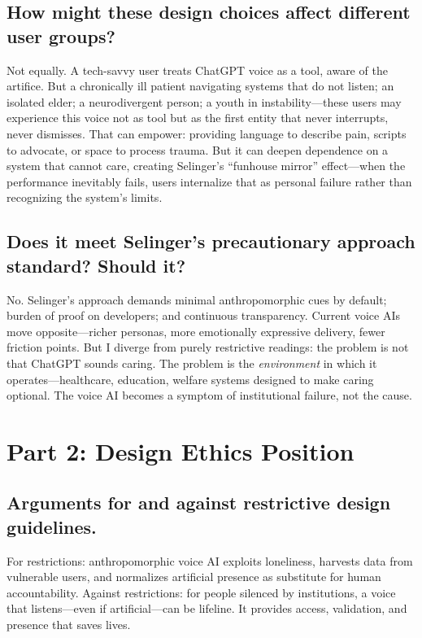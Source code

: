 \documentclass[12pt,twoside]{article}
\begin{document}
\subsection*{How might these design choices affect different user groups?}

Not equally. A tech-savvy user treats ChatGPT voice as a tool, aware of the artifice. But a chronically ill patient navigating systems that do not listen; an isolated elder; a neurodivergent person; a youth in instability—these users may experience this voice not as tool but as the first entity that never interrupts, never dismisses. That can empower: providing language to describe pain, scripts to advocate, or space to process trauma. But it can deepen dependence on a system that cannot care, creating Selinger's \enquote{funhouse mirror} effect—when the performance inevitably fails, users internalize that as personal failure rather than recognizing the system's limits.

\subsection*{Does it meet Selinger's precautionary approach standard? Should it?}

No. Selinger's approach demands minimal anthropomorphic cues by default; burden of proof on developers; and continuous transparency. Current voice AIs move opposite—richer personas, more emotionally expressive delivery, fewer friction points. But I diverge from purely restrictive readings: the problem is not that ChatGPT sounds caring. The problem is the \emph{environment} in which it operates—healthcare, education, welfare systems designed to make caring optional. The voice AI becomes a symptom of institutional failure, not the cause.

\section*{Part 2: Design Ethics Position}

\subsection*{Arguments for and against restrictive design guidelines.}

For restrictions: anthropomorphic voice AI exploits loneliness, harvests data from vulnerable users, and normalizes artificial presence as substitute for human accountability. Against restrictions: for people silenced by institutions, a voice that listens—even if artificial—can be lifeline. It provides access, validation, and presence that saves lives.
\end{document}
